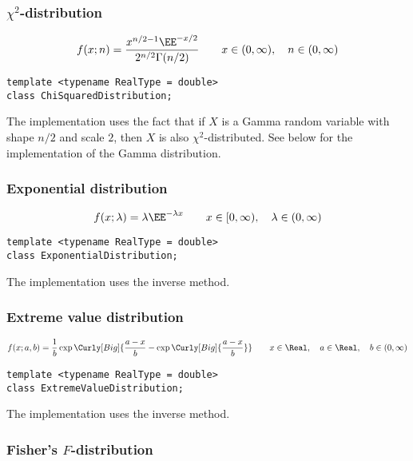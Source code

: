 \subsubsection{\texorpdfstring{$\chi^2$}{Chi-squared}-distribution}

\begin{equation*}
  f(x;n) = \frac{x^{n/2 - 1}\EE^{-x/2}}{2^{n/2}\Gamma(n/2)} \qquad
  x \in (0,\infty),\quad n \in (0,\infty)
\end{equation*}
\begin{Verbatim}
template <typename RealType = double>
class ChiSquaredDistribution;
\end{Verbatim}
The implementation uses the fact that if $X$ is a Gamma random variable with
shape $n / 2$ and scale $2$, then $X$ is also $\chi^2$-distributed. See below
for the implementation of the Gamma distribution.

\subsubsection{Exponential distribution}

\begin{equation*}
  f(x;\lambda) = \lambda\EE^{-\lambda x} \qquad
  x \in [0,\infty),\quad \lambda \in (0,\infty)
\end{equation*}
\begin{Verbatim}
template <typename RealType = double>
class ExponentialDistribution;
\end{Verbatim}
The implementation uses the inverse method.

\subsubsection{Extreme value distribution}

\begin{equation*}
  f(x;a,b) =
  \frac{1}{b}\exp\Curly[Big]{
    \frac{a - x}{b} - \exp\Curly[Big]{\frac{a - x}{b}}} \qquad
  x \in \Real,\quad a \in \Real,\quad b \in (0, \infty)
\end{equation*}
\begin{Verbatim}
template <typename RealType = double>
class ExtremeValueDistribution;
\end{Verbatim}
The implementation uses the inverse method.

\subsubsection{Fisher's \texorpdfstring{$F$}{F}-distribution}

